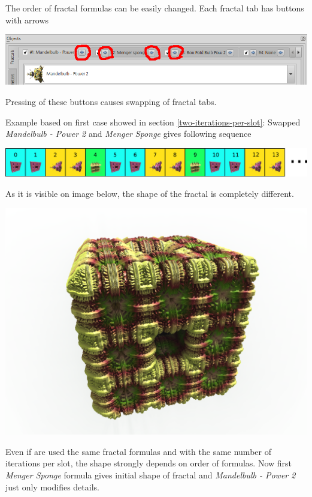 The order of fractal formulas can be easily changed. Each fractal tab has buttons with arrows

\includegraphics[width=\linewidth]{img/manual/media/fractal_tabs_with_defined_fractals_arrows.png}

Pressing of these buttons causes swapping of fractal tabs.

Example based on first case showed in section \ref{two-iterations-per-slot}:  Swapped \emph{Mandelbulb - Power 2} and \emph{Menger Sponge} gives following sequence 

\includegraphics[width=\linewidth]{img/manual/media/iteration_loop_hybrid_sequence_5.png}

As it is visible on image below, the shape of the fractal is completely different.\nopagebreak

\includegraphics[width=0.7\linewidth]{img/manual/media/hybrid_sequence_example_5.png}

Even if are used the same fractal formulas and with the same number of iterations per slot, the shape strongly depends on order of formulas. Now first \emph{Menger Sponge} formula gives initial shape of fractal and \emph{Mandelbulb - Power 2} just only modifies details.
